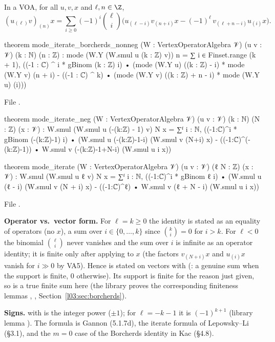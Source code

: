 \begin{theorem}\label{l03:thm:iterate}
In a VOA, for all $u,v,x$ and $\ell,n\in\Z$,
\begin{equation*}
(u_{(\ell)}v)_{(n)}x = \sum_{i\ge0}(-1)^i\binom\ell i\Big(u_{(\ell-i)}v_{(n+i)}x - (-1)^\ell\,v_{(\ell+n-i)}u_{(i)}x\Big).
\end{equation*}
\end{theorem}
\begin{leancode}
theorem mode_iterate_borcherds_nonneg (W : VertexOperatorAlgebra 𝒱) (u v : 𝒱) (k : ℕ) (n : ℤ) :
    mode (W.Y (W.smul u (k : ℤ) v)) n =
      ∑ i ∈ Finset.range (k + 1), ((-1 : ℂ) ^ i * gBinom (k : ℤ) i) •
        (mode (W.Y u) ((k : ℤ) - i) * mode (W.Y v) (n + i)
          - ((-1 : ℂ) ^ k) • (mode (W.Y v) ((k : ℤ) + n - i) * mode (W.Y u) (i)))
\end{leancode}
File .
\begin{leancode}
theorem mode_iterate_neg (W : VertexOperatorAlgebra 𝒱) (u v : 𝒱) (k : ℕ) (N : ℤ) (x : 𝒱) :
    W.smul (W.smul u (-(k:ℤ) - 1) v) N x
      = ∑ᶠ i : ℕ, ((-1:ℂ)^i * gBinom (-(k:ℤ)-1) i) •
          (W.smul u (-(k:ℤ)-1-i) (W.smul v (N+i) x)
            - ((-1:ℂ)^(-(k:ℤ)-1)) • W.smul v (-(k:ℤ)-1+N-i) (W.smul u i x))

theorem mode_iterate (W : VertexOperatorAlgebra 𝒱) (u v : 𝒱) (ℓ N : ℤ) (x : 𝒱) :
    W.smul (W.smul u ℓ v) N x
      = ∑ᶠ i : ℕ, ((-1:ℂ)^i * gBinom ℓ i) •
          (W.smul u (ℓ - i) (W.smul v (N + i) x)
            - ((-1:ℂ)^ℓ) • W.smul v (ℓ + N - i) (W.smul u i x))
\end{leancode}
File .

\begin{dictionary}
\textbf{Operator vs.\ vector form.} For $\ell = k\ge0$ the identity is stated as an equality of
operators (no $x$), a sum over $i\in\{0,\dots,k\}$ since $\binom ki = 0$ for $i>k$. For $\ell<0$ the
binomial $\binom\ell i$ never vanishes and the sum over $i$ is infinite as an operator identity; it is
finite only after applying to $x$ (the factors $v_{(N+i)}x$ and $u_{(i)}x$ vanish for $i\gg0$ by VA5).
Hence  is stated on vectors with  (: a genuine sum when the
support is finite, $0$ otherwise). Its support is finite for the reason just given, so  is a
true finite sum here (the library proves the corresponding finiteness lemmas ,
, Section~\ref{l03:sec:borcherds}).

\textbf{Signs.}  with  is the integer power ($\pm1$); for $\ell = -k-1$ it is
$(-1)^{k+1}$ (library lemma ). The formula is Gannon (5.1.7d), the iterate formula of Lepowsky--Li (§3.1), and the
$m = 0$ case of the Borcherds identity in Kac (§4.8).
\end{dictionary}

